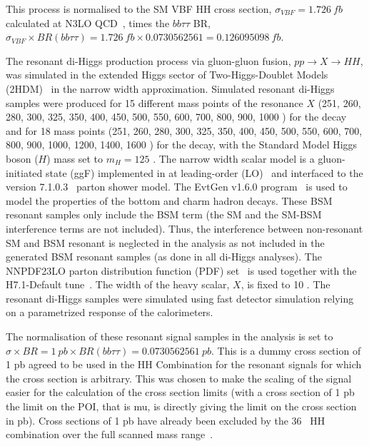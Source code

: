 This process is normalised to the SM VBF HH cross section, $\sigma_{VBF}=\SI{1.726}{fb}$ calculated at N3LO QCD~\cite{Dreyer_2018}, times the $bb\tau\tau$ BR, $\sigma_{VBF} \times BR (bb \tau\tau)  = \SI{1.726}{fb} \times 0.0730562561  =  \SI{0.126095098}{fb}$.  

The resonant di-Higgs production process via gluon-gluon fusion, $pp \rightarrow X \rightarrow HH$, was
simulated in the extended Higgs sector of Two-Higgs-Doublet Models
(2HDM)~\cite{Branco:2011iw} in the narrow width approximation. Simulated
resonant di-Higgs samples were produced for 15 different mass points of the
resonance $X$ (251, 260, 280, 300, 325, 350, 400, 450, 500, 550, 600, 700, 800,
900, 1000 \GeV) for the \lephad decay and for 18 mass points (251, 260, 280, 300, 325, 350, 400, 450, 500, 550, 600, 700, 800,
900, 1000, 1200, 1400, 1600 \GeV) for the \hadhad decay, with the Standard Model Higgs boson ($H$) mass set to $m_H=125$
\GeV. The narrow width scalar model is a gluon-initiated state (ggF) implemented in
\MADGRAPH at leading-order (LO)~\cite{mg5_lo} and interfaced to the  version 7.1.0.3~\cite{Herwigpp}
parton shower model. The EvtGen v1.6.0 program~\cite{EvtGen} is used to model the properties of the bottom and charm hadron decays. 
These BSM resonant samples only include the BSM term (the SM and the SM-BSM interference terms are not included). Thus, the interference between non-resonant SM and BSM resonant is neglected in the analysis as not included in the generated BSM resonant samples (as done in all di-Higgs analyses). The NNPDF23LO parton distribution function (PDF)
set~\cite{NNPDF23PDFSet} is used together with the H7.1-Default
tune~\cite{Gieseke:2012ft}. The width of the heavy scalar, $X$, is fixed to 10
\MeV . The resonant di-Higgs samples were simulated using fast detector
simulation relying on a parametrized response of the calorimeters.

The normalisation of these resonant signal samples in the analysis is set to $\sigma \times BR  = \SI{1}{pb} \times BR (bb \tau \tau)  =  0.073056256 \SI{1}{pb}$. This is a dummy cross section of 1 pb agreed to be used in the HH Combination for the resonant signals for which the cross section is arbitrary. This was chosen to make the scaling of the signal easier for the calculation of the cross section limits (with a cross section of 1 pb the limit on the POI, that is mu, is directly giving the limit on the cross section in pb). Cross sections of 1 pb have already been excluded by the 36 \ifb\ HH combination over the full scanned mass range~\cite{HDBS-2018-58}.



